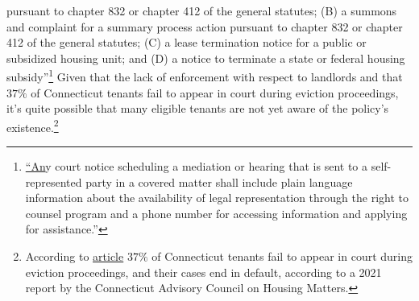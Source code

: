 \documentclass[a4paper,12pt]{article}
\begin{document}
{pursuant to chapter 832 or chapter 412 of the general statutes; (B) a
summons and complaint for a summary process action pursuant to
chapter 832 or chapter 412 of the general statutes; (C) a lease termination
notice for a public or subsidized housing unit; and (D) a notice to
terminate a state or federal housing subsidy''}\footnote{\href{https://www.cga.ct.gov/2021/ACT/PA/PDF/2021PA-00034-R00HB-06531-PA.PDF}{``An}y court notice scheduling a mediation or hearing that is sent to
a self-represented party in a covered matter shall include plain language
information about the availability of legal representation through the
right to counsel program and a phone number for accessing information
and applying for assistance.''} Given that the lack of enforcement with respect to landlords and that $37\%$ of Connecticut tenants fail to appear in court during eviction proceedings, it's quite possible that many eligible tenants are not yet aware of the policy's existence.\footnote{According to \href{https://www.ctpublic.org/news/2022-01-30/some-residents-facing-eviction-could-now-be-eligible-for-free-legal-aid}{article} $37\%$ of Connecticut tenants fail to appear in court during eviction proceedings, and their cases end in default, according to a 2021 report by the Connecticut Advisory Council on Housing Matters.}
\end{document}
